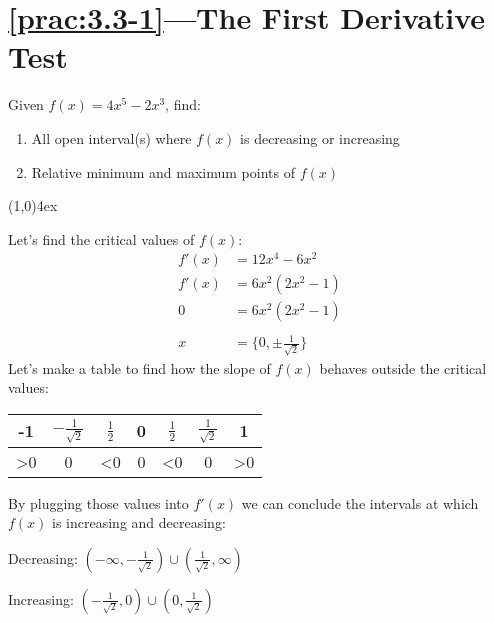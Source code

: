 \documentclass{MathNotes}
\newcommand{\br}{
\begin{center}
\line(1,0){4ex}
\end{center}}
\begin{document}
\section*{\ref{prac:3.3-1}---The First Derivative Test}\label{ans:3.3-1}
Given $\displaystyle f(x)=4x^5-2x^3$, find:
\begin{enumerate}
    \item All open interval(s) where $f(x)$ is decreasing or increasing
    \item Relative minimum and maximum points of $f(x)$
\end{enumerate}
\br
Let's find the critical values of $f(x)$:
\begin{align*}
    f'(x)&=12x^4-6x^2\\
    f'(x)&=6x^2(2x^2-1)\\
    0&=6x^2(2x^2-1)\\
    \\
    x&=\{0,\pm\frac{1}{\sqrt{2}}\}
\end{align*}
Let's make a table to find how the slope of $f(x)$ behaves outside the critical
values:
\begin{center}
    \begin{tabular}{c|c|c|c|c|c|c}
        -1 & $-\frac{1}{\sqrt{2}}$ & $\frac{1}{2}$ & 0 & $\frac{1}{2}$ & $\frac{1}{\sqrt{2}}$ & 1\\
        \hline
        >0&0&<0&0&<0&0&>0
\end{tabular}
\end{center}
By plugging those values into $f'(x)$ we can conclude the intervals at which
$f(x)$ is increasing and decreasing:
\begin{multicols}{2}
Decreasing: $(-\infty,-\frac{1}{\sqrt{2}})\cup(\frac{1}{\sqrt{2}},\infty)$

Increasing: $(-\frac{1}{\sqrt{2}},0)\cup(0,\frac{1}{\sqrt{2}})$
\end{multicols}
\end{document}
